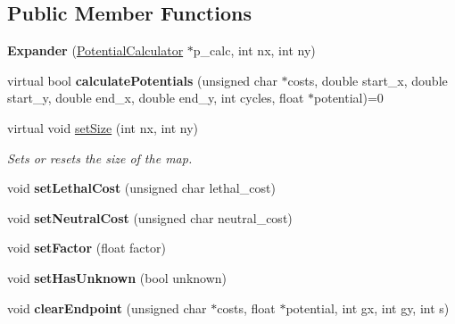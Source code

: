 \subsection*{Public Member Functions}
\begin{DoxyCompactItemize}
\item 
\mbox{\label{classglobal__planner_1_1_expander_a8ccb306a28ea41d2bfd9202d4b16f26a}} 
{\bfseries Expander} (\mbox{\hyperlink{classglobal__planner_1_1_potential_calculator}{Potential\+Calculator}} $\ast$p\+\_\+calc, int nx, int ny)
\item 
\mbox{\label{classglobal__planner_1_1_expander_a7c352121a2ea1e1b650b219004c98786}} 
virtual bool {\bfseries calculate\+Potentials} (unsigned char $\ast$costs, double start\+\_\+x, double start\+\_\+y, double end\+\_\+x, double end\+\_\+y, int cycles, float $\ast$potential)=0
\item 
virtual void \mbox{\hyperlink{classglobal__planner_1_1_expander_aeeaa60103de1ee71a1969e40a3735094}{set\+Size}} (int nx, int ny)
\begin{DoxyCompactList}\small\item\em Sets or resets the size of the map. \end{DoxyCompactList}\item 
\mbox{\label{classglobal__planner_1_1_expander_aee9c360fb6316c538bbadcccc6bf98b1}} 
void {\bfseries set\+Lethal\+Cost} (unsigned char lethal\+\_\+cost)
\item 
\mbox{\label{classglobal__planner_1_1_expander_a386d3239f3aaa7a5e583bad9893a8ca1}} 
void {\bfseries set\+Neutral\+Cost} (unsigned char neutral\+\_\+cost)
\item 
\mbox{\label{classglobal__planner_1_1_expander_a53a3174aef024f0a4d01ac3fa7a74489}} 
void {\bfseries set\+Factor} (float factor)
\item 
\mbox{\label{classglobal__planner_1_1_expander_a1dcbac968719e195552d063c4314618e}} 
void {\bfseries set\+Has\+Unknown} (bool unknown)
\item 
\mbox{\label{classglobal__planner_1_1_expander_a02060106b60c2661cb1f1878a151a40e}} 
void {\bfseries clear\+Endpoint} (unsigned char $\ast$costs, float $\ast$potential, int gx, int gy, int s)
\end{DoxyCompactItemize}
